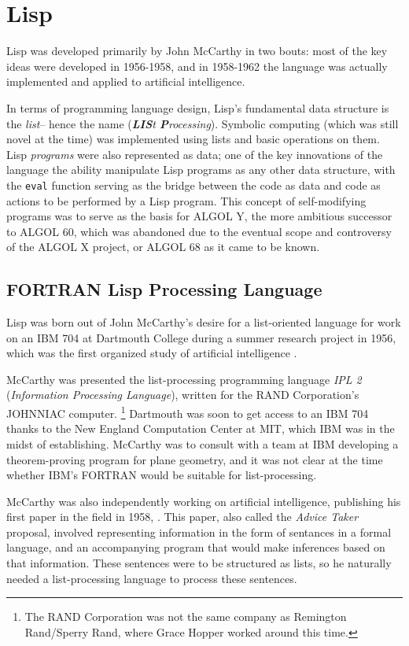 \section{Lisp}

Lisp was developed primarily by John McCarthy in two bouts:
most of the key ideas were developed in 1956-1958,
and in 1958-1962 the language was actually implemented and applied to artificial
intelligence.

In terms of programming language design, Lisp's fundamental data structure is the \textit{list}--
hence the name (\textit{\textbf{LIS}t \textbf{P}rocessing}).
Symbolic computing (which was still novel at the time) was implemented using lists and basic
operations on them.
Lisp \textit{programs} were also represented as data; one of the key innovations of the language
the ability manipulate Lisp programs as any other data structure, with the \texttt{eval}
function serving as the bridge between the code as data and code as actions to be performed
by a Lisp program.
This concept of self-modifying programs was to serve as the basis for ALGOL Y,
the more ambitious successor to ALGOL 60,
which was abandoned due to the eventual scope and controversy of the ALGOL X project,
or ALGOL 68 as it came to be known.

\subsection{FORTRAN Lisp Processing Language}

Lisp was born out of John McCarthy's desire for a list-oriented language
for work on an IBM 704 at Dartmouth College during a summer research project
in 1956, which was the first organized study of artificial intelligence
\cite{mccarthy_history_of_lisp_1978}.

McCarthy was presented the list-processing programming language \textit{IPL 2}
(\textit{Information Processing Language}),
written for the RAND Corporation's JOHNNIAC computer.
\footnote{The RAND Corporation was not the same company as Remington Rand/Sperry Rand, where Grace Hopper worked around this time.}
Dartmouth was soon to get access to an IBM 704 thanks to the New England Computation Center
at MIT, which IBM was in the midst of establishing.
McCarthy was to consult with a team at IBM developing a theorem-proving program for plane geometry,
and it was not clear at the time whether IBM's FORTRAN would be suitable for list-processing.

McCarthy was also independently working on artificial intelligence,
publishing his first paper in the field in 1958,
.
This paper, also called the \textit{Advice Taker} proposal,
involved representing information in the form of sentances in a formal language,
and an accompanying program that would make inferences based on that information.
These sentences were to be structured as lists, so he naturally
needed a list-processing language to process these sentences.

